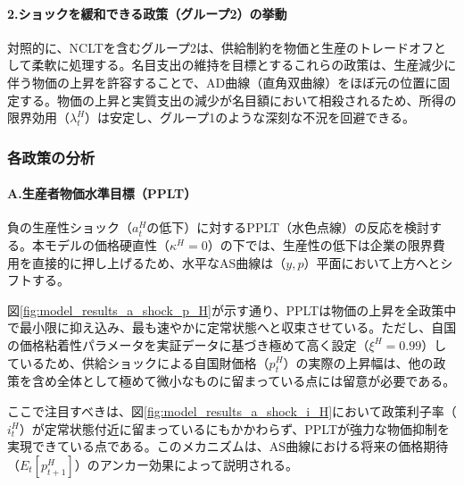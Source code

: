 \paragraph{2.ショックを緩和できる政策（グループ2）の挙動}\label{sec:model_results_a_shock_asad_analysis_group2}
対照的に、NCLTを含むグループ2は、供給制約を物価と生産のトレードオフとして柔軟に処理する。名目支出の維持を目標とするこれらの政策は、生産減少に伴う物価の上昇を許容することで、AD曲線（直角双曲線）をほぼ元の位置に固定する。物価の上昇と実質支出の減少が名目額において相殺されるため、所得の限界効用（\(\lambda_t^H\)）は安定し、グループ1のような深刻な不況を回避できる。

\subsubsection{各政策の分析}\label{sec:model_results_a_shock_asad_analysis_detail}

\paragraph{A.生産者物価水準目標（PPLT）}\label{sec:model_results_a_shock_asad_analysis_pplt}
負の生産性ショック（\(a_t^H\)の低下）に対するPPLT（水色点線）の反応を検討する。本モデルの価格硬直性（\(\kappa^H=0\)）の下では、生産性の低下は企業の限界費用を直接的に押し上げるため、水平なAS曲線は（\(y,p\)）平面において上方へとシフトする。

図\ref{fig:model_results_a_shock_p_H}が示す通り、PPLTは物価の上昇を全政策中で最小限に抑え込み、最も速やかに定常状態へと収束させている。ただし、自国の価格粘着性パラメータを実証データに基づき極めて高く設定（\(\xi^H=0.99\)）しているため、供給ショックによる自国財価格（\(p_t^H\)）の実際の上昇幅は、他の政策を含め全体として極めて微小なものに留まっている点には留意が必要である。

ここで注目すべきは、図\ref{fig:model_results_a_shock_i_H}において政策利子率（\(i_t^H\)）が定常状態付近に留まっているにもかかわらず、PPLTが強力な物価抑制を実現できている点である。このメカニズムは、AS曲線における将来の価格期待（\(E_t[p_{t+1}^H]\)）のアンカー効果によって説明される。


